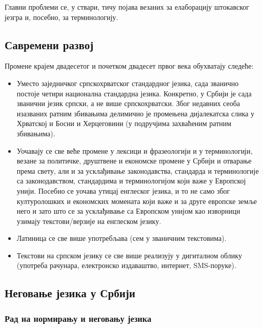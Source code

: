 {\begin{multicols}{2}

Главни проблеми се, у ствари, тичу појава везаних за елаборацију штокавског језгра и, посебно, за терминологију.





\subsection {Савремени развој}
  
Промене крајем двадесетог и почетком двадесет првог века обухватају следеће:
\begin{itemize}
 \item Уместо заједничког српскохрватског стандардног језика, сада званично постоје четири национална стандардна језика. Конкретно, у Србији је сада званични језик српски, а не више српскохрватски. Због недавних сеоба изазваних ратним збивањима делимично је промењена дијалекатска слика у Хрватској и Босни и Херцеговини (у подручјима захваћеним ратним збивањима). 
\item Уочавају се све веће промене у лексици и фразеологији и у терминологији, везане за политичке, друштвене и економске промене у Србији и отварање према свету, али и за усклађивање законодавства, стандарда и терминологије са законодавством, стандардима и терминологијом који важе у Европској унији. Посебно се уочава утицај енглеског језика, и то не само због културолошких и економских момената који важе и за друге европске земље него и зато што се за усклађивање са Европском унијом као изворници узимају текстови/верзије на енглеском језику. 
\item Латиница се све више употребљава (сем у званичним текстовима).
\item Текстови на српском језику се све више реализују у дигиталном облику (употреба рачунара, електронско издаваштво, интернет, SMS-поруке). 
\end{itemize}

\subsection {Неговање језика у Србији}

\subsubsection{Рад на нормирању и неговању језика}   


\end{multicols}}
